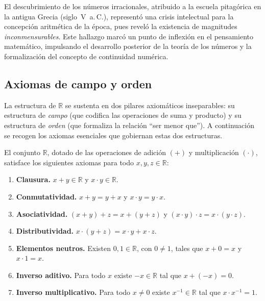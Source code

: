 \begin{rem}
El descubrimiento de los números irracionales, atribuido a la escuela pitagórica
en la antigua Grecia (siglo~V~a.\,C.), representó una crisis intelectual para
la concepción aritmética de la época, pues reveló la existencia de magnitudes
\emph{inconmensurables}. Este hallazgo marcó un punto de inflexión en el
pensamiento matemático, impulsando el desarrollo posterior de la teoría de los
números y la formalización del concepto de continuidad numérica.
\end{rem}

\subsection{Axiomas de campo y orden}

La estructura de $\mathbb{R}$ se sustenta en dos pilares axiomáticos
inseparables: su estructura de \emph{campo} (que codifica las operaciones de
suma y producto) y su estructura de \emph{orden} (que formaliza la relación
``ser menor que''). A continuación se recogen los axiomas esenciales que
gobiernan estas dos estructuras.

\begin{theorem}\label{thm:campo}
El conjunto $\mathbb{R}$, dotado de las operaciones de adición $(+)$ y
multiplicación $(\cdot)$, satisface los siguientes axiomas para todo
$x, y, z \in \mathbb{R}$:
\begin{enumerate}
   \item \textbf{Clausura.} $x + y \in \mathbb{R}$ y $x \cdot y \in \mathbb{R}$.
   \item \textbf{Conmutatividad.} $x + y = y + x$ y $x \cdot y = y \cdot x$.
   \item \textbf{Asociatividad.} $(x+y)+z = x+(y+z)$ y $(x \cdot y)\cdot z = x
         \cdot(y \cdot z)$.
   \item \textbf{Distributividad.} $x\cdot(y+z) = x\cdot y + x\cdot z$.
   \item \textbf{Elementos neutros.} Existen $0, 1 \in \mathbb{R}$, con
         $0 \neq 1$, tales que $x + 0 = x$ y $x \cdot 1 = x$.
   \item \textbf{Inverso aditivo.} Para todo $x$ existe $-x \in \mathbb{R}$ tal
         que $x + (-x) = 0$.
   \item \textbf{Inverso multiplicativo.} Para todo $x \neq 0$ existe $x^{-1}
         \in \mathbb{R}$ tal que $x \cdot x^{-1} = 1$.
\end{enumerate}
\end{theorem}

